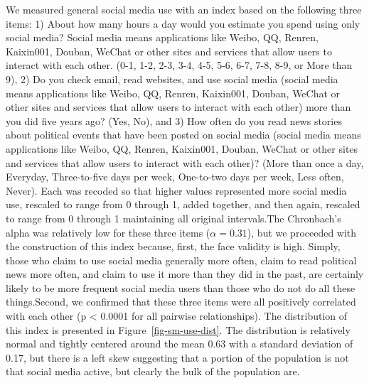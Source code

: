 \documentclass[
  letterpaper,
  DIV=11,
  numbers=noendperiod]{scrartcl}
\begin{document}
We measured general social media use with an index based on the
following three items: 1) About how many hours a day would you estimate
you spend using only social media? Social media means applications like
Weibo, QQ, Renren, Kaixin001, Douban, WeChat or other sites and services
that allow users to interact with each other. (0-1, 1-2, 2-3, 3-4, 4-5,
5-6, 6-7, 7-8, 8-9, or More than 9), 2) Do you check email, read
websites, and use social media (social media means applications like
Weibo, QQ, Renren, Kaixin001, Douban, WeChat or other sites and services
that allow users to interact with each other) more than you did five
years ago? (Yes, No), and 3) How often do you read news stories about
political events that have been posted on social media (social media
means applications like Weibo, QQ, Renren, Kaixin001, Douban, WeChat or
other sites and services that allow users to interact with each other)?
(More than once a day, Everyday, Three-to-five days per week, One-to-two
days per week, Less often, Never). Each was recoded so that higher
values represented more social media use, rescaled to range from 0
through 1, added together, and then again, rescaled to range from 0
through 1 maintaining all original intervals.The Chronbach's alpha was
relatively low for these three items (\(\alpha = 0.31\)), but we
proceeded with the construction of this index because, first, the face
validity is high. Simply, those who claim to use social media generally
more often, claim to read political news more often, and claim to use it
more than they did in the past, are certainly likely to be more frequent
social media users than those who do not do all these things.Second, we
confirmed that these three items were all positively correlated with
each other (p \textless{} 0.0001 for all pairwise relationships). The
distribution of this index is presented in Figure~\ref{fig-sm-use-dist}.
The distribution is relatively normal and tightly centered around the
mean 0.63 with a standard deviation of 0.17, but there is a left skew
suggesting that a portion of the population is not that social media
active, but clearly the bulk of the population are.
\end{document}
